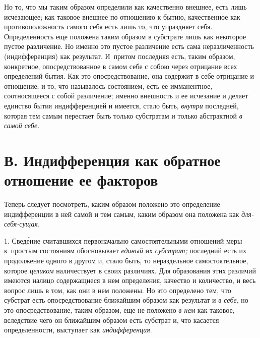 Но то, что мы таким образом определили как качественно внешнее, есть лишь
исчезающее; как таковое внешнее по отношению к бытию, качественное как
противоположность самого себя есть лишь то, что упраздняет себя.
Определенность еще положена таким образом в субстрате лишь как некоторое
пустое различение. Но именно это пустое различение есть сама
неразличенность (индифференция) как результат. И~притом последняя есть,
таким образом, конкретное, опосредствованное в самом себе с собою через
отрицание всех определений бытия. Как это опосредствование, она содержит в
себе отрицание и отношение; и то, что называлось состоянием, есть ее
имманентное, соотносящееся с собой различение; именно внешность и ее
исчезание и делает единство бытия индифференцией и имеется, стало быть,
{\em внутри} последней, которая тем самым перестает
быть только субстратам и только абстрактной {\em в самой себе}.

\section[В. Индифференция как обратное отношение ее факторов]%
  {В. Индифференция как обратное отношение
   ее факторов}

Теперь следует посмотреть, каким
образом положено это определение индифференции в ней самой и тем самым,
каким образом она положена как {\em для-себя-сущая}.

1. Свед\'{е}ние считавшихся первоначально самостоятельными отношений меры
к~простым состояниям обосновывает {\em единый} их
{\em субстрат;} последний есть их продолжение одного в
другом и, стало быть, то нераздельное самостоятельное, которое
{\em целиком} наличествует в своих различиях. Для
образования этих различий имеются налицо содержащиеся в нем определения,
качество и количество, и весь вопрос лишь в том, как они в нем положены. Но
это определено тем, что субстрат есть опосредствование ближайшим образом
как результат и {\em в себе}, но это опосредствование,
таким образом, еще не положено {\em в нем} как таковое,
вследствие чего он ближайшим образом есть субстрат и, что касается
определенности, выступает как {\em индифференция}.

